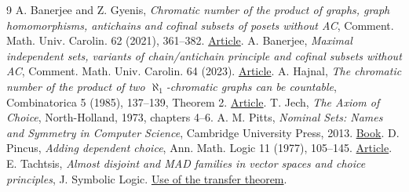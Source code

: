 \documentclass[11pt]{article}
\begin{document}
\begin{thebibliography}{9}
 A. Banerjee and Z. Gyenis, \emph{Chromatic number of the product of graphs, graph homomorphisms, antichains and cofinal subsets of posets without AC}, Comment. Math. Univ. Carolin. 62 (2021), 361--382. \href{https://doi.org/10.14712/1213-7243.2021.028}{Article}.
 A. Banerjee, \emph{Maximal independent sets, variants of chain/antichain principle and cofinal subsets without AC}, Comment. Math. Univ. Carolin. 64 (2023). \href{https://doi.org/10.14712/1213-7243.2023.028}{Article}.
 A. Hajnal, \emph{The chromatic number of the product of two $\aleph_1$-chromatic graphs can be countable}, Combinatorica 5 (1985), 137--139, Theorem 2. \href{https://doi.org/10.1007/BF02579376}{Article}.
 T. Jech, \emph{The Axiom of Choice}, North-Holland, 1973, chapters 4--6.
 A. M. Pitts, \emph{Nominal Sets: Names and Symmetry in Computer Science}, Cambridge University Press, 2013. \href{https://doi.org/10.1017/CBO9781139084673}{Book}.
 D. Pincus, \emph{Adding dependent choice}, Ann. Math. Logic 11 (1977), 105--145. \href{https://doi.org/10.1016/0003-4843(77)90011-0}{Article}.
 E. Tachtsis, \emph{Almost disjoint and MAD families in vector spaces and choice principles}, J. Symbolic Logic. \href{https://doi.org/10.1017/jsl.2021.91}{Use of the transfer theorem}.
\end{thebibliography}
\end{document}
